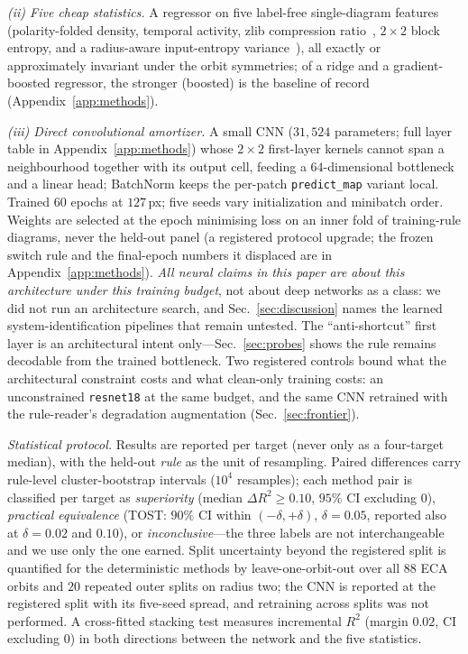 \documentclass[aip,cha,amsmath,amssymb,reprint,floatfix]{revtex4-2}
\newcommand{\rtwo}{$R^2$}
\begin{document}
\emph{(ii) Five cheap statistics.} A regressor on five label-free
single-diagram features (polarity-folded density, temporal activity, zlib
compression ratio~\cite{zenil2010}, $2\times2$ block entropy, and a
radius-aware input-entropy
variance~\cite{wuensche1999}), all exactly or approximately invariant under
the orbit symmetries; of a ridge and a gradient-boosted regressor, the
stronger (boosted) is the baseline of record (Appendix~\ref{app:methods}).

\emph{(iii) Direct convolutional amortizer.} A small CNN ($31{,}524$
parameters; full layer table in Appendix~\ref{app:methods}) whose $2\times2$
first-layer kernels cannot span a neighbourhood together with its output cell,
feeding a $64$-dimensional bottleneck and a linear head; BatchNorm keeps the
per-patch \texttt{predict\_map} variant local. Trained $60$ epochs at
$127\,$px; five seeds vary initialization and minibatch order. Weights are
selected at the epoch minimising loss on an inner fold of training-rule
diagrams, never the held-out panel (a registered protocol upgrade; the frozen
switch rule and the final-epoch numbers it displaced are in
Appendix~\ref{app:methods}). \emph{All neural
claims in this paper are about this architecture under this training budget},
not about deep networks as a class: we did not run an architecture search, and
Sec.~\ref{sec:discussion} names the learned system-identification pipelines
that remain untested. The ``anti-shortcut'' first layer is an architectural
intent only---Sec.~\ref{sec:probes} shows the rule remains decodable from the
trained bottleneck. Two registered controls bound what the architectural
constraint costs and what clean-only training costs: an unconstrained \texttt{resnet18}
at the same budget, and the same CNN retrained with the rule-reader's
degradation augmentation (Sec.~\ref{sec:frontier}).

\emph{Statistical protocol.} Results are reported per target (never only as a
four-target median), with the held-out \emph{rule} as the unit of resampling.
Paired differences carry rule-level cluster-bootstrap intervals ($10^4$
resamples); each method pair is classified per target as \emph{superiority}
(median $\Delta R^2\ge0.10$, $95\%$ CI excluding $0$), \emph{practical
equivalence} (TOST: $90\%$ CI within $(-\delta,+\delta)$, $\delta=0.05$,
reported also at $\delta=0.02$ and $0.10$), or \emph{inconclusive}---the three
labels are not interchangeable and we use only the one earned. Split
uncertainty beyond the registered split is quantified for the deterministic
methods by leave-one-orbit-out over all $88$ ECA orbits and $20$ repeated outer
splits on radius two; the CNN is reported at the registered split with its
five-seed spread, and retraining across splits was not performed. A
cross-fitted stacking test measures incremental \rtwo{} (margin
$0.02$, CI excluding $0$) in both directions between the network and the five
statistics.
\end{document}

